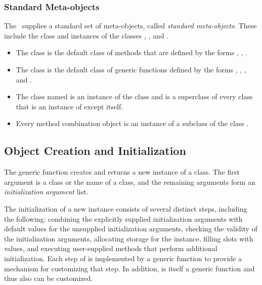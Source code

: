 \subsubsection{Standard Meta-objects}

The \OS\ supplies a standard set of meta-objects, called \emph{standard
meta-objects}. These include the class  and
instances of the classes , 
, and .

\begin{itemize}

\item  
The class  is the default class of
methods that are defined by the forms , 
, .%

\item 
The class  is the default class of 
generic functions defined by the forms ,
, , %
and .

\item  The class named  is an instance of
the class  and is a superclass of every class that
is an instance of  except itself.

\item  Every method combination object is an instance of a
subclass of the class .
\end{itemize}

\subsection{Object Creation and Initialization}
\label{Object-Creation-and-Initialization-SECTION}

The generic function  creates and returns a new
instance of a class.  The first argument is a class or the name of a
class, and the remaining arguments form an \emph{initialization argument}
list.  

The initialization of a new instance consists of several distinct
steps, including the following: combining the explicitly supplied
initialization arguments with default values for the unsupplied
initialization arguments, checking the validity of the initialization
arguments, allocating storage for the instance, filling slots with
values, and executing user-supplied methods that perform additional
initialization.  Each step of  is implemented by a
generic function to provide a mechanism for customizing that step.  In
addition,  is itself a generic function and thus
also can be customized.

